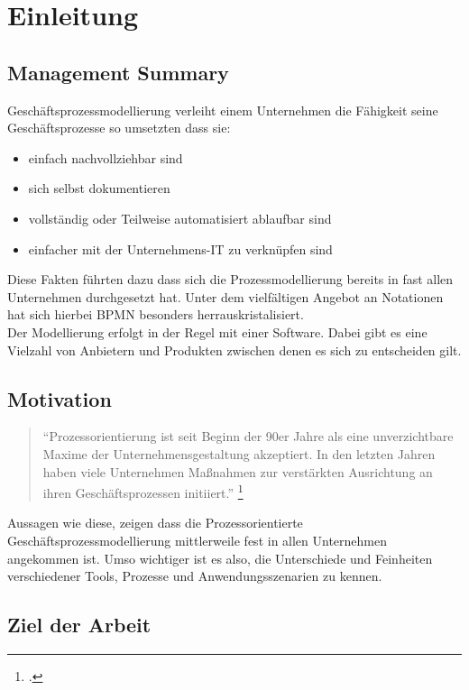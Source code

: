 \section{Einleitung}


\subsection{Management Summary}


Geschäftsprozessmodellierung verleiht einem Unternehmen die Fähigkeit seine
Geschäftsprozesse so umsetzten dass sie:

\begin{itemize}
\item einfach nachvollziehbar sind
\item sich selbst dokumentieren
\item vollständig oder Teilweise automatisiert ablaufbar sind
\item einfacher mit der Unternehmens-IT zu verknüpfen sind
\end{itemize}

Diese Fakten führten dazu dass sich die Prozessmodellierung bereits in fast
allen Unternehmen durchgesetzt hat.
Unter dem vielfältigen Angebot an Notationen hat sich hierbei BPMN besonders
herrauskristalisiert.\\

Der Modellierung erfolgt in der Regel mit einer Software. Dabei gibt es eine
Vielzahl von Anbietern und Produkten zwischen denen es sich zu entscheiden gilt.


\subsection{Motivation}

\begin{quote}
"`Prozessorientierung ist seit Beginn der 90er Jahre als eine unverzichtbare 
Maxime der Unternehmensgestaltung akzeptiert. In den letzten Jahren 
haben viele Unternehmen Maßnahmen
 zur verstärkten Ausrichtung an ihren Geschäftsprozessen initiiert."' 
\footcite[S.182]{prozessmanagement:leitfaden}
\end{quote}


Aussagen wie diese, zeigen dass die Prozessorientierte
Geschäftsprozessmodellierung mittlerweile fest in allen Unternehmen angekommen
ist.
Umso wichtiger ist es also, die Unterschiede und Feinheiten verschiedener Tools,
Prozesse und Anwendungsszenarien zu kennen.

\subsection{Ziel der Arbeit}

